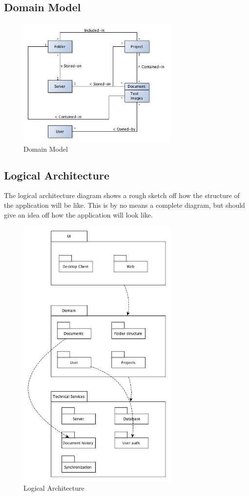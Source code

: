 \documentclass[11pt]{article}
\begin{document}
\subsection{Domain Model}
\label{sec-2-3}
\begin{figure}[H]
  		\centering
    	\includegraphics[width=300px]{images/DomainModel.jpg}
    	\caption{Domain Model}
\end{figure}
\subsection{Logical Architecture}
\label{sec-2-4}

   The logical architecture diagram shows a rough sketch off how the structure of the application
   will be like. This is by no means a complete diagram, but should give an idea off how
   the application will look like.
\begin{figure}[H]
  		\centering
    	\includegraphics[width=300px]{images/LogicalArchitecture.jpg}
    	\caption{Logical Architecture}
\end{figure}
\end{document}

